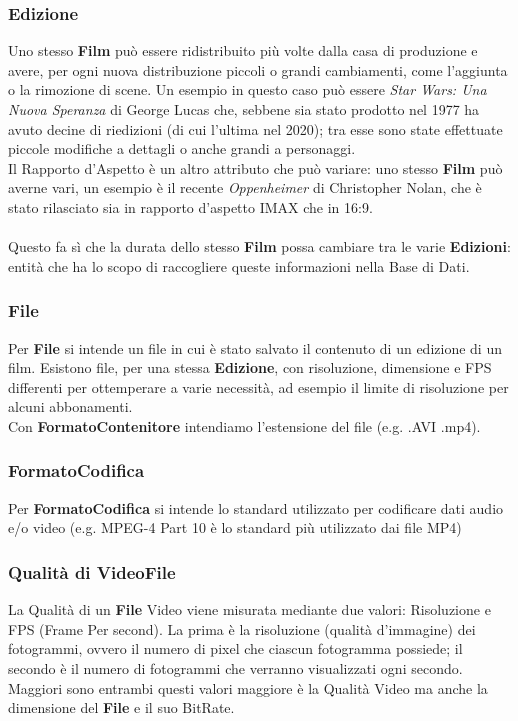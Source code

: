 \documentclass{article}
\begin{document}
\subsubsection{Edizione}
Uno stesso \textbf{Film} può essere ridistribuito più volte dalla casa di produzione e avere, per ogni nuova distribuzione piccoli o grandi cambiamenti, come l'aggiunta o la rimozione di scene. Un esempio in questo caso può essere \textit{Star Wars: Una Nuova Speranza} di George Lucas che, sebbene sia stato prodotto nel 1977 ha avuto decine di riedizioni (di cui l'ultima nel 2020); tra esse sono state effettuate piccole modifiche a dettagli o anche grandi a personaggi.
\\
Il Rapporto d'Aspetto è un altro attributo che può variare: uno stesso \textbf{Film} può averne vari, un esempio è il recente \textit{Oppenheimer} di Christopher Nolan, che è stato rilasciato sia in rapporto d'aspetto IMAX che in 16:9.
%
%
%
%
%
%
%
%
\\
\\
Questo fa sì che la durata dello stesso \textbf{Film} possa cambiare tra le varie \textbf{Edizioni}: entità che ha lo scopo di raccogliere queste informazioni nella Base di Dati.
\\
\subsubsection{File}
Per \textbf{File} si intende un file in cui è stato salvato il contenuto di un edizione di un film. Esistono file, per una stessa \textbf{Edizione}, con risoluzione, dimensione e FPS differenti per ottemperare a varie necessità, ad esempio il limite di risoluzione per alcuni abbonamenti. \\ 
Con \textbf{FormatoContenitore} intendiamo l'estensione del file (e.g. .AVI .mp4). 
\subsubsection{FormatoCodifica}
Per \textbf{FormatoCodifica} si intende lo standard utilizzato per codificare dati audio e/o video (e.g. MPEG-4 Part 10 è lo standard più utilizzato dai file MP4) 
\subsubsection{Qualità di VideoFile}
La Qualità di un \textbf{File} Video viene misurata mediante due valori: Risoluzione e FPS (Frame Per second). La prima è la risoluzione (qualità d'immagine) dei fotogrammi, ovvero il numero di pixel che ciascun fotogramma possiede; il secondo è il numero di fotogrammi che verranno visualizzati ogni secondo.
 \\
Maggiori sono entrambi questi valori maggiore è la Qualità Video ma anche la dimensione del \textbf{File} e il suo BitRate. \\
\end{document}
